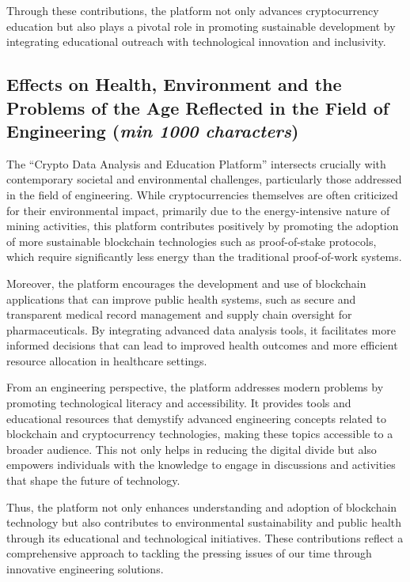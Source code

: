 \documentclass[12pt]{report}
\newcommand{\characters}[1]{(\textit{min #1 characters})}
\begin{document}
Through these contributions, the platform not only advances cryptocurrency education but also plays a pivotal role in promoting sustainable development by integrating educational outreach with technological innovation and inclusivity.

\subsection{Effects on Health, Environment and the Problems of the Age Reflected in the Field of Engineering \characters{1000}}
The ``Crypto Data Analysis and Education Platform'' intersects crucially with contemporary societal and environmental challenges, particularly those addressed in the field of engineering. While cryptocurrencies themselves are often criticized for their environmental impact, primarily due to the energy-intensive nature of mining activities, this platform contributes positively by promoting the adoption of more sustainable blockchain technologies such as proof-of-stake protocols, which require significantly less energy than the traditional proof-of-work systems.

Moreover, the platform encourages the development and use of blockchain applications that can improve public health systems, such as secure and transparent medical record management and supply chain oversight for pharmaceuticals. By integrating advanced data analysis tools, it facilitates more informed decisions that can lead to improved health outcomes and more efficient resource allocation in healthcare settings.

From an engineering perspective, the platform addresses modern problems by promoting technological literacy and accessibility. It provides tools and educational resources that demystify advanced engineering concepts related to blockchain and cryptocurrency technologies, making these topics accessible to a broader audience. This not only helps in reducing the digital divide but also empowers individuals with the knowledge to engage in discussions and activities that shape the future of technology.

Thus, the platform not only enhances understanding and adoption of blockchain technology but also contributes to environmental sustainability and public health through its educational and technological initiatives. These contributions reflect a comprehensive approach to tackling the pressing issues of our time through innovative engineering solutions.
\end{document}
